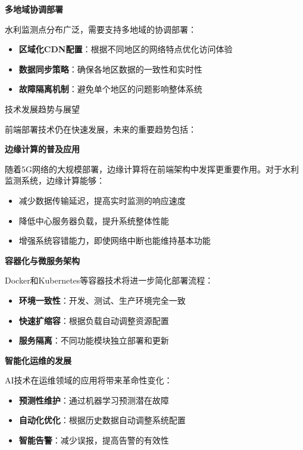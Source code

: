 {{\textbf{多地域协调部署}

水利监测点分布广泛，需要支持多地域的协调部署：

\begin{itemize}
\tightlist
\item
  \textbf{区域化CDN配置}：根据不同地区的网络特点优化访问体验
\item
  \textbf{数据同步策略}：确保各地区数据的一致性和实时性
\item
  \textbf{故障隔离机制}：避免单个地区的问题影响整体系统
\end{itemize}

 技术发展趋势与展望

前端部署技术仍在快速发展，未来的重要趋势包括：

\textbf{边缘计算的普及应用}

随着5G网络的大规模部署，边缘计算将在前端架构中发挥更重要作用。对于水利监测系统，边缘计算能够：

\begin{itemize}
\tightlist
\item
  减少数据传输延迟，提高实时监测的响应速度
\item
  降低中心服务器负载，提升系统整体性能
\item
  增强系统容错能力，即使网络中断也能维持基本功能
\end{itemize}

\textbf{容器化与微服务架构}

Docker和Kubernetes等容器技术将进一步简化部署流程：

\begin{itemize}
\tightlist
\item
  \textbf{环境一致性}：开发、测试、生产环境完全一致
\item
  \textbf{快速扩缩容}：根据负载自动调整资源配置
\item
  \textbf{服务隔离}：不同功能模块独立部署和更新
\end{itemize}

\textbf{智能化运维的发展}

AI技术在运维领域的应用将带来革命性变化：

\begin{itemize}
\tightlist
\item
  \textbf{预测性维护}：通过机器学习预测潜在故障
\item
  \textbf{自动化优化}：根据历史数据自动调整系统配置
\item
  \textbf{智能告警}：减少误报，提高告警的有效性
\end{itemize}

}}
